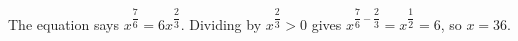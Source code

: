 The equation says $x^{\dfrac76}=6x^{\dfrac23}$. Dividing by $x^{\dfrac23}>0$ gives $x^{\dfrac76-\dfrac23}=x^{\dfrac12}=6$, so $x=\boxed{36}$.
